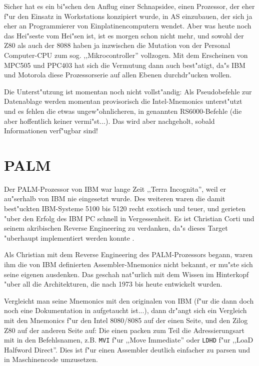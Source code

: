 \documentclass[12pt,a4paper,twoside]{report}
\newcommand{\asname}{AS}
\begin{document}
Sicher hat es ein bi"schen den Anflug einer Schnapsidee, einen Prozessor,
der eher f"ur den Einsatz in Workstations konzipiert wurde, in \asname{}
einzubauen, der sich ja eher an Programmierer von Einplatinencomputern
wendet.  Aber was heute noch das Hei"seste vom Hei"sen ist, ist es morgen
schon nicht mehr, und sowohl der Z80 als auch der 8088 haben ja inzwischen
die Mutation von der Personal Computer-CPU zum sog. ,,Mikrocontroller''
vollzogen.  Mit dem Erscheinen von MPC505 und PPC403 hat sich die Vermutung
dann auch best"atigt, da"s IBM und Motorola diese Prozessorserie auf allen
Ebenen durchdr"ucken wollen.
\par
Die Unterst"utzung ist momentan noch nicht vollst"andig: Als Pseudobefehle
zur Datenablage werden momentan provisorisch die Intel-Mnemonics
unterst"utzt und es fehlen die etwas ungew"ohnlicheren, in \cite{Mot601}
genannten RS6000-Befehle (die aber hoffentlich keiner vermi"st...).  Das
wird aber nachgeholt, sobald Informationen verf"ugbar sind!


\section{PALM}

Der PALM-Prozessor von IBM war lange Zeit ,,Terra Incognita'', weil er
au"serhalb von IBM nie eingesetzt wurde.  Des weiteren waren die damit
best"uckten IBM-Systeme 5100 bis 5120 recht exotisch und teuer, und
gerieten "uber den Erfolg des IBM PC schnell in Vergessenheit.  Es ist
Christian Corti und seinem akribischen Reverse Engineering zu
verdanken, da"s dieses Target "uberhaupt implementiert werden konnte
\cite{CortPalm}.

Als Christian mit dem Reverse Engineering des PALM-Prozessors begann,
waren ihm die von IBM definierten Assembler-Mnemonics nicht bekannt, er
mu"ste sich seine eigenen ausdenken.  Das geschah nat"urlich mit dem
Wissen im Hinterkopf "uber all die Architekturen, die nach 1973 bis
heute entwickelt wurden.

Vergleicht man seine Mnemonics mit den originalen von IBM (f"ur die
dann doch noch eine Dokumentation in \cite{IBMPalm} aufgetaucht
ist...), dann dr"angt sich ein Vergleich mit den Mnemonics f"ur den
Intel 8080/8085 auf der einen Seite, und den Zilog Z80 auf der anderen
Seite auf: Die einen packen zum Teil die Adressierungsart mit in den
Befehlsnamen, z.B.  {\tt MVI} f"ur ,,Move Immediate'' oder {\tt LDHD}
f"ur ,,LoaD Halfword Direct''.  Dies ist f"ur einen Assembler deutlich
einfacher zu parsen und in Maschinencode umzusetzen.
\end{document}

